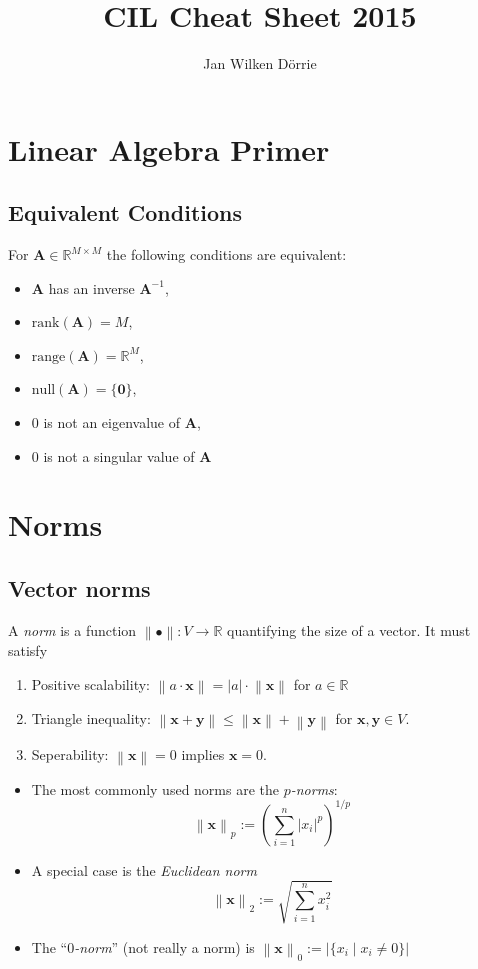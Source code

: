 \documentclass[conference,11pt]{IEEEtran}
\newcommand{\card}[1]{\left\lvert#1\right\rvert}
\newcommand{\abs}[1]{\left\lvert#1\right\rvert}
\newcommand{\norm}[1]{\left\lVert#1\right\rVert}
\newcommand{\matr}[1]{\boldsymbol{\mathbf{#1}}}
\newcommand{\vect}[1]{\boldsymbol{\mathbf{#1}}}
\newcommand{\R}{\mathbb{R}}
\begin{document}
\title{CIL Cheat Sheet 2015}
\author{Jan Wilken D\"orrie}
\maketitle

\section{Linear Algebra Primer}
\subsection{Equivalent Conditions}
For $\matr{A} \in \R^{M \times M}$ the following conditions
are equivalent:
\begin{itemize}
  \item $\matr{A}$ has an inverse $\matr{A}^{-1}$,
  \item $\mathrm{rank}(\matr{A}) = M$,
  \item $\mathrm{range}(\matr{A}) = \R^M$,
  \item $\mathrm{null}(\matr{A}) = \{\vect{0}\}$,
  \item $0$ is not an eigenvalue of $\matr{A}$,
  \item $0$ is not a singular value of $\matr{A}$
\end{itemize}


\section{Norms}
\subsection{Vector norms}
A \emph{norm} is a function $\norm{\bullet} : V \to \R$ quantifying the
size of a vector. It must satisfy
\begin{enumerate}
  \item Positive scalability: $\norm{a \cdot \vect{x}} = \abs{a} \cdot
    \norm{\vect{x}}$ for $a \in \R$
  \item Triangle inequality: $\norm{\vect{x} + \vect{y}} \leq
    \norm{\vect{x}} + \norm{\vect{y}}$ for $\vect{x}, \vect{y} \in V$.
  \item Seperability: $\norm{\vect{x}} = 0$ implies $\vect{x} = 0$.
\end{enumerate}

\begin{itemize}
  \item The most commonly used norms are the \emph{$p$-norms}:
    \[
      \norm{\vect{x}}_p := {\left(\sum_{i=1}^n \abs{x_i}^p \right)}^{1/p}
    \]
  \item A special case is the \emph{Euclidean norm}
    \[ \norm{\vect{x}}_2 := \sqrt{\sum_{i=1}^n x_i^2} \]
  \item The ``\emph{$0$-norm}'' (not really a norm) is
    \( \norm{\vect{x}}_0 := \card{\{x_i \mid x_i \neq 0\}} \)
\end{itemize}
\end{document}
